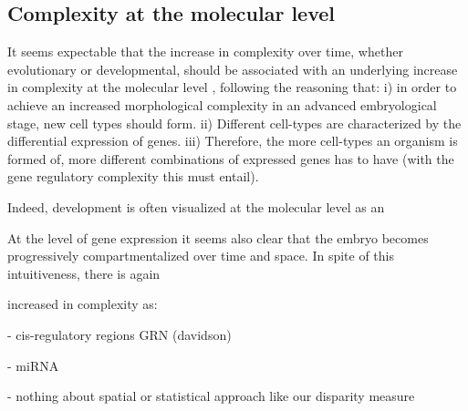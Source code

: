 	

\subsection{Complexity at the molecular level}

It seems expectable that the increase in complexity over time, whether evolutionary or developmental, should be associated with an underlying increase in complexity at the molecular level \citep{Arthur2010}, following the reasoning that:
i) in order to achieve an increased morphological complexity in an advanced embryological stage, new cell types should form.
ii) Different cell-types are characterized by the differential expression of genes.
iii) Therefore, the more cell-types an organism is formed of, more different combinations of expressed genes has to have (with the gene regulatory complexity this must entail).

Indeed, development is often visualized at the molecular level as an 

At the level of gene expression it seems also clear that the embryo becomes progressively compartmentalized over time and space. In spite of this intuitiveness, there is again

increased in complexity as:

- cis-regulatory regions GRN (davidson)

- miRNA

- nothing about spatial or statistical approach like our disparity measure
